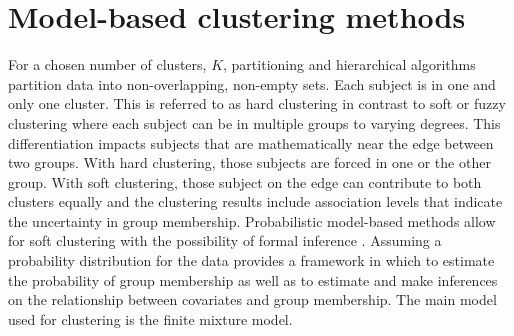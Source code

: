 \section{Model-based clustering methods}
For a chosen number of clusters, $K$, partitioning and hierarchical algorithms partition data into non-overlapping, non-empty sets. Each subject is in one and only one cluster. This is referred to as hard clustering in contrast to soft or fuzzy clustering where each subject can be in multiple groups to varying degrees. This differentiation impacts subjects that are mathematically near the edge between two groups. With hard clustering, those subjects are forced in one or the other group. With soft clustering, those subject on the edge can contribute to both clusters equally and the clustering results include association levels that indicate the uncertainty in group membership. Probabilistic model-based methods allow for soft clustering with the possibility of formal inference \cite{fraley2002}. Assuming a probability distribution for the data provides a framework in which to estimate the probability of group membership as well as to estimate and make inferences on the relationship between covariates and group membership. The main model used for clustering is the finite mixture model.

